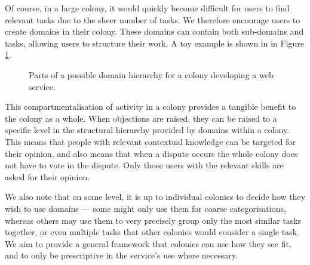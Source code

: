 Of course, in a large colony, it would quickly become difficult for users to find relevant tasks due to the sheer number of tasks. We therefore encourage users to create domains in their colony. These domains can contain both sub-domains and tasks, allowing users to structure their work. A toy example is shown in in Figure \ref{fig:domainhierarchysample}. 

\begin{figure}[h]
    \centering
 \caption{Parts of a possible domain hierarchy for a colony developing a web service.}
 \label{fig:domainhierarchysample}

\end{figure}

This compartmentalisation of activity in a colony provides a tangible benefit to the colony as a whole. When objections are raised, they can be raised to a specific level in the structural hierarchy provided by domains within a colony. This means that people with relevant contextual knowledge can be targeted for their opinion, and also means that when a dispute occurs the whole colony does not have to vote in the dispute. Only those users with the relevant skills are asked for their opinion.

We also note that on some level, it is up to individual colonies to decide how they wish to use domains --- some might only use them for coarse categorisations, whereas others may use them to very precisely group only the most similar tasks together, or even multiple tasks that other colonies would consider a single task. We aim to provide a general framework that colonies can use how they see fit, and to only be prescriptive in the service's use where necessary.
